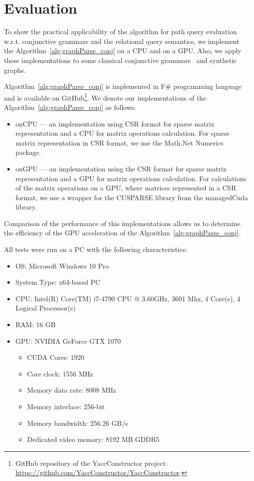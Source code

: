 \section{Evaluation} \label{section_evaluation}
To show the practical applicability of the algorithm for path query evaluation w.r.t. conjunctive grammars and the relational query semantics, we implement the Algorithm~\ref{alg:graphParse_conj} on a CPU and on a GPU. Also, we apply these implementations to some classical conjunctive grammars~\cite{okhotin2001conjunctive} and synthetic graphs.

Algorithm~\ref{alg:graphParse_conj} is implemented in F\# programming language~\cite{fsharp} and is available on GitHub\footnote{GitHub repository of the YaccConstructor project: \url{https://github.com/YaccConstructor/YaccConstructor}.}. We denote our implementations of the Algorithm~\ref{alg:graphParse_conj} as follows:
\begin{itemize}
	\item onCPU --- an implementation using CSR format for sparse matrix representation and a CPU for matrix operations calculation. For sparse matrix representation in CSR format, we use the Math.Net Numerics package.
	\item onGPU --- an implementation using the CSR format for sparse matrix representation and a GPU for matrix operations calculation. For calculations of the matrix operations on a GPU, where matrices represented in a CSR format, we use a wrapper for the CUSPARSE library from the managedCuda library.
\end{itemize}

Comparison of the performance of this implementations allows us to determine the efficiency of the GPU acceleration of the Algorithm~\ref{alg:graphParse_conj}.

All tests were run on a PC with the following characteristics:
\begin{itemize}
	\item OS: Microsoft Windows 10 Pro
	\item System Type: x64-based PC
	\item CPU: Intel(R) Core(TM) i7-4790 CPU @ 3.60GHz, 3601 Mhz, 4 Core(s), 4 Logical Processor(s)
	\item RAM: 16 GB
	\item GPU: NVIDIA GeForce GTX 1070
	\begin{itemize}
		\item CUDA Cores:		1920 
		\item Core clock:		1556 MHz 
		\item Memory data rate:	8008 MHz
		\item Memory interface:	256-bit 
		\item Memory bandwidth:	256.26 GB/s
		\item Dedicated video memory:	8192 MB GDDR5
	\end{itemize}
\end{itemize}

